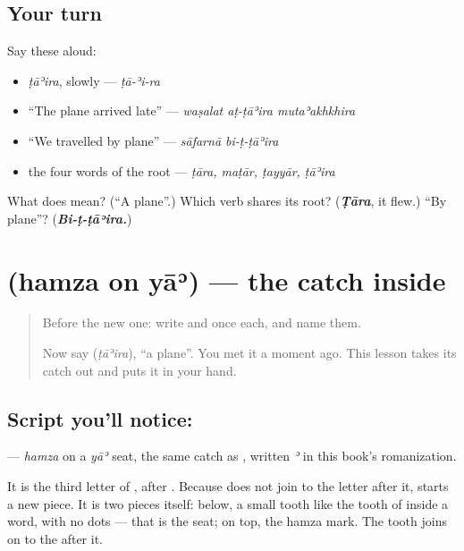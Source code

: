 \subsection*{Your turn}
Say these aloud:

\begin{itemize}
\raggedright
  \item \emph{ṭāʾira}, slowly — \emph{ṭā-ʾi-ra}
  \item \textquotedblleft{}The plane arrived late\textquotedblright{} — \emph{waṣalat aṭ-ṭāʾira mutaʾakhkhira}
  \item \textquotedblleft{}We travelled by plane\textquotedblright{} — \emph{sāfarnā bi-ṭ-ṭāʾira}
  \item the four words of the root — \emph{ṭāra, maṭār, ṭayyār, ṭāʾira}
\end{itemize}

\begin{tcolorbox}[breakable,colback=teal!4,colframe=teal!35!black,title={Before you move on}]
What does  mean? (\textquotedblleft{}A plane\textquotedblright{}.) Which verb shares its root? (\emph{\textbf{Ṭāra}}, it flew.) \textquotedblleft{}By plane\textquotedblright{}? (\emph{\textbf{Bi-ṭ-ṭāʾira.}})
\end{tcolorbox}
\section[\texorpdfstring{\ar{ئ} (hamza on yāʾ)}{ئ (hamza on yāʾ)}]{ (hamza on yāʾ) — the catch inside }

\label{lesson:AR-W288-hamza-on-yaa}



\begin{quote}
Before the new one: write  and  once each, and name them.

Now say \textbf{} (\emph{ṭāʾira}), \textquotedblleft{}a plane\textquotedblright{}. You met it a moment ago. This lesson takes its catch out and puts it in your hand.
\end{quote}

\subsection*{Script you'll notice: }
\textbf{} — \emph{hamza} on a \emph{yāʾ} seat, the same catch as \textbf{}, written \emph{ʾ} in this book's romanization.

It is the third letter of \textbf{}, after \textbf{}. Because \textbf{} does not join to the letter after it, \textbf{} starts a new piece. It is two pieces itself: below, a small tooth like the tooth of \textbf{} inside a word, with no dots — that is the seat; on top, the hamza mark. The tooth joins on to the \textbf{} after it.

